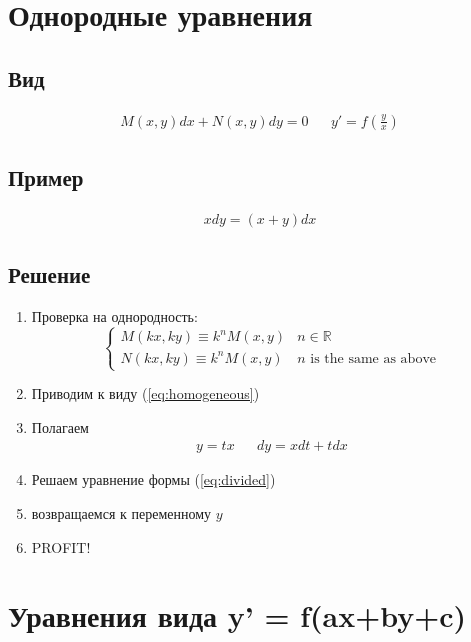 \documentclass[fontsize=10pt,a4paper,fleqn]{scrreprt} %
\numberwithin{equation}{section}
\begin{document}
\section{Однородные уравнения}
\label{sec:homogeneous}

\subsection{Вид}

\begin{align}
\label{eq:homogeneous}
\boxed{M(x,y)dx + N(x,y)dy = 0} && \boxed{y' =f\left(\frac{y}{x}\right)}
\end{align}

\subsection{Пример}
\begin{align*}
xdy = (x+y)dx
\end{align*}

\subsection{Решение}
\begin{enumerate}
\item Проверка на однородность:
  \begin{equation*}
    \left\{
    \begin{array}{ll}
    M(kx, ky) \equiv k^n M(x,y) & n \in \mathbb{R} \\
    N(kx, ky) \equiv k^n M (x, y) & n \text{ is the same as above}
  \end{array}
  \right.
  \end{equation*}
\item Приводим к виду (\ref{eq:homogeneous})
\item Полагаем
  \begin{align*}
    y = tx && dy = xdt + tdx
  \end{align*}
\item Решаем уравнение формы (\ref{eq:divided})
\item возвращаемся к переменному $y$
\item PROFIT!
\end{enumerate}

\section{Уравнения вида y' = f(ax+by+c)}
\label{sec:axbyc}
\end{document}
